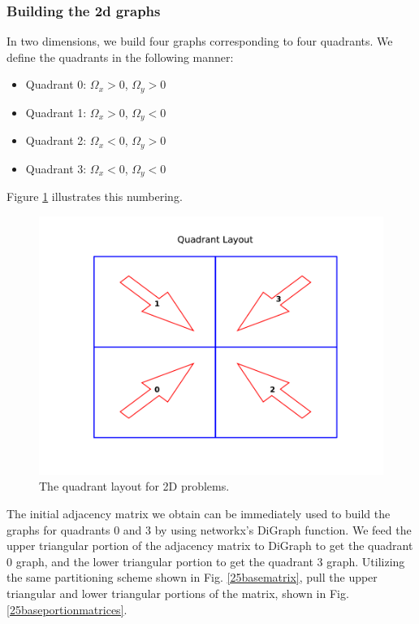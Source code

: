\subsubsection{Building the 2d graphs}
In two dimensions, we build four graphs corresponding to four quadrants. 
We define the quadrants in the following manner:
\begin{itemize}
  \item Quadrant 0: $\Omega_x > 0$, $\Omega_y > 0$
  \item Quadrant 1: $\Omega_x > 0$, $\Omega_y < 0$
  \item Quadrant 2: $\Omega_x < 0$, $\Omega_y > 0$
  \item Quadrant 3: $\Omega_x < 0$, $\Omega_y < 0$
\end{itemize}
Figure \ref{quadrant_layout} illustrates this numbering.
\begin{figure}[H]
\centering
\includegraphics{figures/quadrant_layout.pdf}
\caption{The quadrant layout for 2D problems.}
\label{quadrant_layout}
\end{figure}
The initial adjacency matrix we obtain can be immediately used to build the graphs for quadrants 0 and 3 by using networkx's DiGraph function.
We feed the upper triangular portion of the adjacency matrix to DiGraph to get the quadrant 0 graph, and the lower triangular portion to get the quadrant 3 graph.
Utilizing the same partitioning scheme shown in Fig. \ref{25basematrix}, pull the upper triangular and lower triangular portions of the matrix, shown in Fig. \ref{25baseportionmatrices}.
